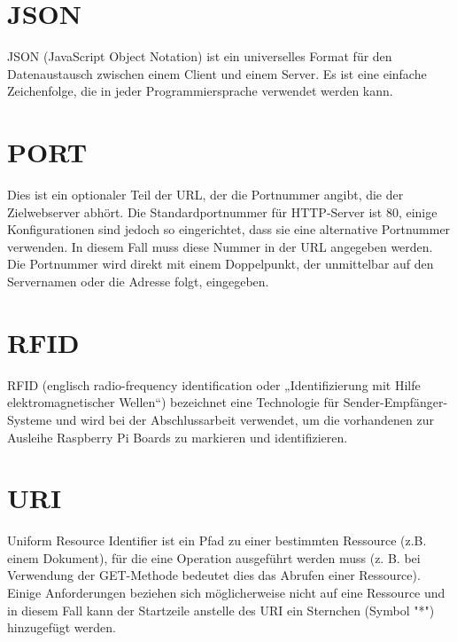\section*{JSON}
\label{sec:appendix:json}
JSON (JavaScript Object Notation) ist ein universelles Format für den Datenaustausch zwischen einem Client und einem Server. Es ist eine einfache Zeichenfolge, die in jeder Programmiersprache verwendet werden kann.

\section*{PORT} 
\label{sec:appendix:port}
Dies ist ein optionaler Teil der URL, der die Portnummer angibt, die der Zielwebserver abhört. Die Standardportnummer für HTTP-Server ist 80, einige Konfigurationen sind jedoch so eingerichtet, dass sie eine alternative Portnummer verwenden. In diesem Fall muss diese Nummer in der URL angegeben werden. Die Portnummer wird direkt mit einem Doppelpunkt, der unmittelbar auf den Servernamen oder die Adresse folgt, eingegeben.\cite[p.31]{shklar:webapplication} 

\section*{RFID}
\label{sec:appendix:rfid}
RFID (englisch radio-frequency identification oder „Identifizierung mit Hilfe elektromagnetischer Wellen“) bezeichnet eine Technologie für Sender-Empfänger-Systeme und wird bei der Abschlussarbeit verwendet, um die vorhandenen zur Ausleihe Raspberry Pi Boards zu markieren und identifizieren.

\section*{URI}
\label{sec:appendix:uri}
Uniform Resource Identifier ist ein Pfad zu einer bestimmten Ressource (z.B.  einem Dokument), für die eine Operation ausgeführt werden muss (z. B. bei Verwendung der GET-Methode bedeutet dies das Abrufen einer Ressource). Einige Anforderungen beziehen sich möglicherweise nicht auf eine Ressource und in diesem Fall kann der Startzeile anstelle des URI ein Sternchen (Symbol "*") hinzugefügt werden.


 
